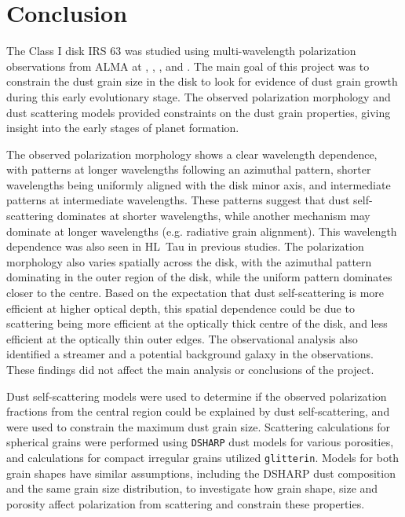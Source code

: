\chapter{Conclusion}
\label{ch_conclusion}


The Class I disk IRS 63 was studied using multi-wavelength polarization observations from ALMA at \bfourNS, \bfiveNS, \bsixNS, and \bsevenNS. The main goal of this project was to constrain the dust grain size in the disk to look for evidence of dust grain growth during this early evolutionary stage. The observed polarization morphology and dust scattering models provided constraints on the dust grain properties, giving insight into the early stages of planet formation. 


The observed polarization morphology shows a clear wavelength dependence, with patterns at longer wavelengths following an azimuthal pattern, shorter wavelengths being uniformly aligned with the disk minor axis, and intermediate patterns at intermediate wavelengths. These patterns suggest that dust self-scattering dominates at shorter wavelengths, while another mechanism may dominate at longer wavelengths (e.g. radiative grain alignment). This wavelength dependence was also seen in HL~Tau in previous studies. The polarization morphology also varies spatially across the disk, with the azimuthal pattern dominating in the outer region of the disk, while the uniform pattern dominates closer to the centre. Based on the expectation that dust self-scattering is more efficient at higher optical depth, this spatial dependence could be due to scattering being more efficient at the optically thick centre of the disk, and less efficient at the optically thin outer edges. The observational analysis also identified a streamer and a potential background galaxy in the observations. These findings did not affect the main analysis or conclusions of the project.


Dust self-scattering models were used to determine if the observed polarization fractions from the central region could be explained by dust self-scattering, and were used to constrain the maximum dust grain size. Scattering calculations for spherical grains were performed using \texttt{DSHARP} dust models for various porosities, and calculations for compact irregular grains utilized \texttt{glitterin}. Models for both grain shapes have similar assumptions, including the DSHARP dust composition and the same grain size distribution, to investigate how grain shape, size and porosity affect polarization from scattering and constrain these properties.  





